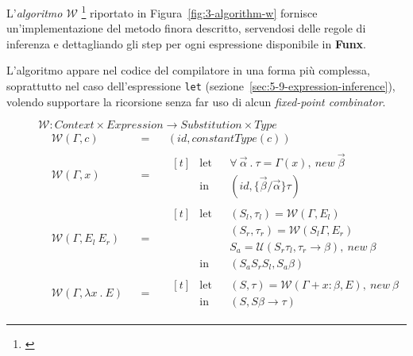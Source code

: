 \noindent L'\textit{algoritmo $\mathcal{W}$}%
\footnote{ \cite{Lee-1998-FolkloreInference}}
riportato in Figura~\ref{fig:3-algorithm-w} fornisce un'implementazione del metodo finora descritto,
servendosi delle regole di inferenza e dettagliando gli step per ogni espressione disponibile in \textbf{Funx}.

\noindent L'algoritmo appare nel codice del compilatore in una forma più complessa,
soprattutto nel caso dell'espressione \texttt{let} (sezione~\ref{sec:5-9-expression-inference}),
volendo supportare la ricorsione senza far uso di alcun \textit{fixed-point combinator}.

\newpage

\begin{figure}
    $\mathcal{W} : Context \times Expression \rightarrow Substitution \times Type$
    \newcommand{\algW}[2]{\mathcal{W}(#1, #2)}
    \newcommand{\algWline}[2]{& \algW{#1}{#2} & & = & &}
    \[
        \begin{aligned}
            \algWline{\Gamma}{c} (id, constantType(c))
            \\
            \algWline{\Gamma}{x}
            \begin{aligned}[t]
                 & \text{let} &  & \forall\ \vec{\alpha}\ .\ \tau = \Gamma(x),\ new\ \vec{\beta} \\
                 & \text{in}  &  & (id, \{\vec{\beta} / \vec{\alpha}\} \tau)
            \end{aligned}
            \\
            \algWline{\Gamma}{E_l\ E_r}
            \begin{aligned}[t]
                 & \text{let} &  & (S_l, \tau_l) = \algW{\Gamma}{E_l}                                   \\
                 &            &  & (S_r, \tau_r) = \algW{S_l\Gamma}{E_r}                                \\
                 &            &  & S_a = \mathcal{U}(S_r \tau_l, \tau_r \rightarrow \beta),\ new\ \beta \\
                 & \text{in}  &  & (S_a S_r S_l, S_a \beta)
            \end{aligned}
            \\
            \algWline{\Gamma}{\lambda x\ .\ E}
            \begin{aligned}[t]
                 & \text{let} &  & (S, \tau) = \algW{\Gamma + x : \beta}{E},\ new\ \beta \\
                 & \text{in}  &  & (S, S \beta \rightarrow \tau)

\end{aligned}
\end{aligned}\]
\end{figure}
